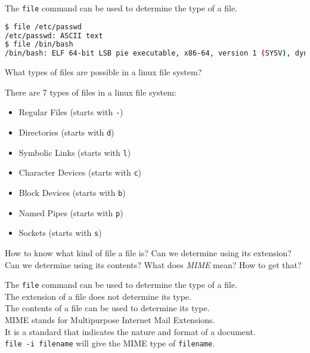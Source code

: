 
The \lstinline|file| command can be used to determine the type of a file.

\begin{lstlisting}[language=bash]
$ file /etc/passwd
/etc/passwd: ASCII text
$ file /bin/bash
/bin/bash: ELF 64-bit LSB pie executable, x86-64, version 1 (SYSV), dynamically linked, interpreter /lib64/ld-linux-x86-64.so.2, BuildID[sha1]=165d3a5ffe12a4f1a9b71c84f48d94d5e714d3db, for GNU/Linux 4.4.0, stripped
\end{lstlisting}

\begin{qs}
  What types of files are possible in a linux file system?
\end{qs}

\begin{ans}
  There are 7 types of files in a linux file system:
  \begin{itemize}
    \item Regular Files (starts with \lstinline|-|)
    \item Directories (starts with \lstinline|d|)
    \item Symbolic Links (starts with \lstinline|l|)
    \item Character Devices (starts with \lstinline|c|)
    \item Block Devices (starts with \lstinline|b|)
    \item Named Pipes (starts with \lstinline|p|)
    \item Sockets (starts with \lstinline|s|)
  \end{itemize}
\end{ans}

\begin{qs}
  How to know what kind of file a file is? Can we determine using
  its extension? Can we determine using its contents? What does
  \textit{MIME} mean?
How to get that?
\end{qs}

\begin{ans}
  The \lstinline|file| command can be used to determine the type of a file. \\
  The extension of a file does not determine its type. \\
  The contents of a file can be used to determine its type. \\
  MIME stands for Multipurpose Internet Mail Extensions. \\
  It is a standard that indicates the nature and format of a document. \\
  \lstinline|file -i filename| will give the MIME type of \lstinline|filename|.
\end{ans}

